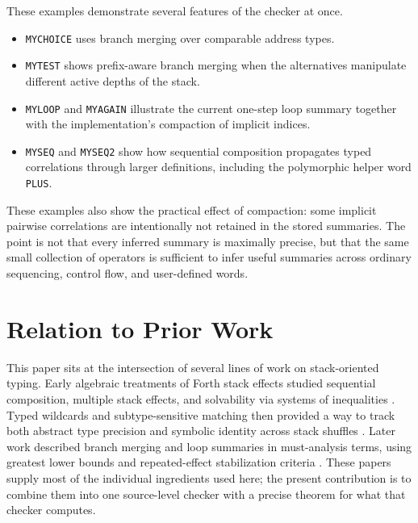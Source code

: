 \documentclass[acmsmall,screen,review,anonymous,nonacm]{acmart}
\begin{document}
These examples demonstrate several features of the checker at once.
\begin{itemize}
\item \texttt{MYCHOICE} uses branch merging over comparable address types.
\item \texttt{MYTEST} shows prefix-aware branch merging when the alternatives manipulate different active depths of the stack.
\item \texttt{MYLOOP} and \texttt{MYAGAIN} illustrate the current one-step loop summary together with the implementation's compaction of implicit indices.
\item \texttt{MYSEQ} and \texttt{MYSEQ2} show how sequential composition propagates typed correlations through larger definitions, including the polymorphic helper word \texttt{PLUS}.
\end{itemize}

These examples also show the practical effect of compaction: some implicit pairwise correlations are intentionally not retained in the stored summaries. The point is not that every inferred summary is maximally precise, but that the same small collection of operators is sufficient to infer useful summaries across ordinary sequencing, control flow, and user-defined words.

\section{Relation to Prior Work}
This paper sits at the intersection of several lines of work on stack-oriented typing. Early algebraic treatments of Forth stack effects studied sequential composition, multiple stack effects, and solvability via systems of inequalities \cite{poial1991algebraic,poial1992multiple,poial1994algebraic}. Typed wildcards and subtype-sensitive matching then provided a way to track both abstract type precision and symbolic identity across stack shuffles \cite{stoddart1993type,poial2002wildcards}. Later work described branch merging and loop summaries in must-analysis terms, using greatest lower bounds and repeated-effect stabilization criteria \cite{poial2006typing}. These papers supply most of the individual ingredients used here; the present contribution is to combine them into one source-level checker with a precise theorem for what that checker computes.
\end{document}
